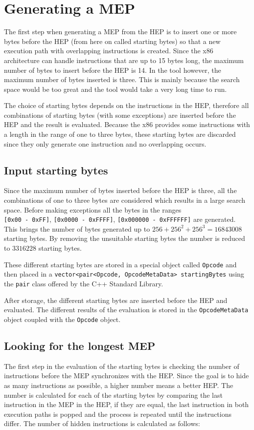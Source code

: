 \documentclass[11pt,twoside]{eitExjobb}
\begin{document}
\section{Generating a MEP}
The first step when generating a MEP from the HEP is to insert one or more bytes before the HEP (from here on called starting bytes) so that a new execution path with overlapping instructions is created. Since the x86 architecture can handle instructions that are up to 15 bytes long, the maximum number of bytes to insert before the HEP is 14. In the tool however, the maximum number of bytes inserted is three. This is mainly because the search space would be too great and the tool would take a very long time to run. 

The choice of starting bytes depends on the instructions in the HEP, therefore all combinations of starting bytes (with some exceptions) are inserted before the HEP and the result is evaluated. Because the x86 provides some instructions with a length in the range of one to three bytes, these starting bytes are discarded since they only generate one instruction and no overlapping occurs.


\subsection{Input starting bytes}
Since the maximum number of bytes inserted before the HEP is three, all the combinations of one to three bytes are considered which results in a large search space. Before making exceptions all the bytes in the ranges\\ 
\texttt{[0x00 - 0xFF]}, \texttt{[0x0000 - 0xFFFF]}, \texttt{[0x000000 - 0xFFFFFF]} are generated. This brings the number of bytes generated up to $256 + 256^2 + 256^3 = 16843008$ starting bytes. By removing the unsuitable starting bytes the number is reduced to $3316228$ starting bytes.

These different starting bytes are stored in a special object called \texttt{Opcode} and then placed in a \texttt{vector<pair<Opcode, OpcodeMetaData> startingBytes} using the \texttt{pair} class offered by the C++ Standard Library.

After storage, the different starting bytes are inserted before the HEP and evaluated. The different results of the evaluation is stored in the \texttt{OpcodeMetaData} object coupled with the \texttt{Opcode} object. 

\subsection{Looking for the longest MEP}
The first step in the evaluation of the starting bytes is checking the number of instructions before the MEP synchronizes with the HEP. Since the goal is to hide as many instructions as possible, a higher number means a better HEP. The number is calculated for each of the starting bytes by comparing the last instruction in the MEP in the HEP, if they are equal, the last instruction in both execution paths is popped and the process is repeated until the instructions differ. The number of hidden instructions is calculated as follows:
\end{document}

